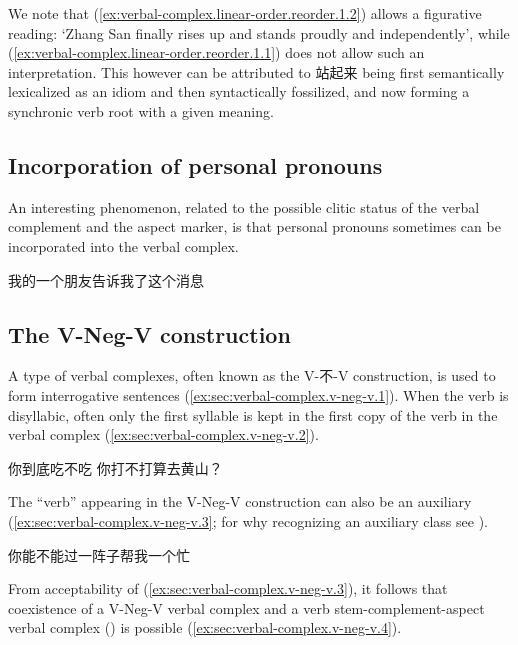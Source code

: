 \documentclass[UTF8, a4paper, oneside, scheme=plain, 12pt]{ctexrep}
\newcommand{\translate}[1]{`#1'}
\begin{document}
We note that (\ref{ex:verbal-complex.linear-order.reorder.1.2}) allows a figurative reading:
\translate{Zhang San finally rises up and stands proudly and independently},
while (\ref{ex:verbal-complex.linear-order.reorder.1.1})
does not allow such an interpretation.
This however can be attributed to 站起来 being first semantically lexicalized as an idiom
and then syntactically fossilized,
and now forming a synchronic verb root with a given meaning.

\subsection{Incorporation of personal pronouns}\label{sec:verbal-complex.v-c-a.incorporation}

An interesting phenomenon, related to the possible clitic status of the verbal complement and the aspect marker,
is that personal pronouns sometimes can be incorporated into the verbal complex.

\begin{exe}
    \ex 我的一个朋友告诉我了这个消息
\end{exe}

\subsection{The V-Neg-V construction}\label{sec:verbal-complex.v-neg-v}

A type of verbal complexes, often known as the V-不-V construction,
is used to form interrogative sentences
(\ref{ex:sec:verbal-complex.v-neg-v.1}).
When the verb is disyllabic, often only the first syllable is kept in the first copy of the verb in the verbal complex
(\ref{ex:sec:verbal-complex.v-neg-v.2}).

\begin{exe}
    \ex\label{ex:sec:verbal-complex.v-neg-v.1} 你到底吃不吃
    \ex\label{ex:sec:verbal-complex.v-neg-v.2} 你打不打算去黄山？
\end{exe}

The ``verb'' appearing in the V-Neg-V construction
can also be an auxiliary (\ref{ex:sec:verbal-complex.v-neg-v.3};
for why recognizing an auxiliary class see ).

\begin{exe}
    \ex\label{ex:sec:verbal-complex.v-neg-v.3} 你能不能过一阵子帮我一个忙
\end{exe}

From acceptability of (\ref{ex:sec:verbal-complex.v-neg-v.3}),
it follows that coexistence of a V-Neg-V verbal complex
and a verb stem-complement-aspect verbal complex ()
is possible (\ref{ex:sec:verbal-complex.v-neg-v.4}).
\end{document}
